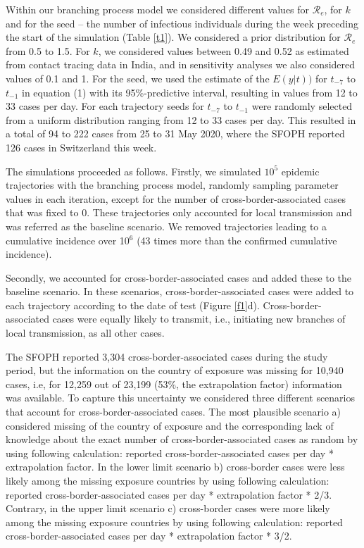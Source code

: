 \documentclass[10pt, a4paper, twoside]{article}
\begin{document}
\begin{multicols}{2}
Within our branching process model we considered different values for $\mathcal{R}_e$, for $k$ and for the seed -- the number of infectious individuals during the week preceding the start of the simulation (Table \ref{t1}).
We considered a prior distribution for $\mathcal{R}_e$ from 0.5 to 1.5.
For $k$, we considered values between 0.49 and 0.52 as estimated from contact tracing data in India\cite{laxminarayan_epidemiology_2020}, and in sensitivity analyses we also considered values of 0.1 and 1.\cite{taube_open-access_2021}
For the seed, we used the estimate of the $E(y|t))$ for $t_{-7}$ to $t_{-1}$ in equation (1) with its 95\%-predictive interval, resulting in values from 12 to 33 cases per day.
For each trajectory seeds for $t_{-7}$ to $t_{-1}$  were randomly selected from a uniform distribution ranging from 12 to 33 cases per day.
This resulted in a total of 94 to 222 cases from 25 to 31 May 2020, where the SFOPH reported 126 cases in Switzerland this week.

The simulations proceeded as follows.
Firstly, we simulated $10^5$ epidemic trajectories with the branching process model, randomly sampling parameter values in each iteration, except for the number of cross-border-associated cases that was fixed to 0.
These trajectories only accounted for local transmission and was referred as the baseline scenario.
We removed trajectories leading to a cumulative incidence over 10$^6$ (43 times more than the confirmed cumulative incidence).

Secondly, we accounted for cross-border-associated cases and added these to the baseline scenario.
In these scenarios, cross-border-associated cases were added to each trajectory according to the date of test (Figure \ref{f1}d).
Cross-border-associated cases were equally likely to transmit, i.e., initiating new branches of local transmission, as all other cases.

The SFOPH reported 3,304 cross-border-associated cases during the study period, but the information on the country of exposure was missing for 10,940 cases, i.e, for 12,259 out of 23,199 (53\%, the extrapolation factor) information was available.
To capture this uncertainty we considered three different scenarios that account for cross-border-associated cases.
The most plausible scenario a) considered missing of the country of exposure and the corresponding lack of knowledge about the exact number of cross-border-associated cases as random by using following calculation: reported cross-border-associated cases per day * extrapolation factor.
In the lower limit scenario b) cross-border cases were less likely among the missing exposure countries by using following calculation: reported cross-border-associated cases per day * extrapolation factor * 2/3.
Contrary, in the upper limit scenario c) cross-border cases were more likely among the missing exposure countries by using following calculation: reported cross-border-associated cases per day * extrapolation factor * 3/2.

\end{multicols}
\end{document}
